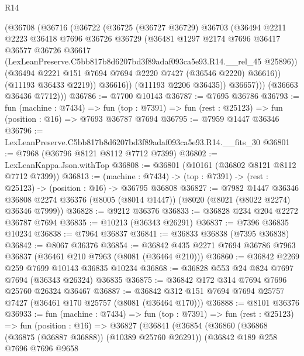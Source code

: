 \begin{lexlean}{R14}
\begin{coremodule}
              (@36708
                (@36716
                  (@36722
                    (@36725
                      (@36727 @36729)
                      @36703
                      (@36494
                        @2211
                        @2223
                        @36418
                        @7696
                        @36726
                        @36729
                        (@36481
                          @1297
                          @2174
                          @7696
                          @36417
                          @36577
                          @36726
                          @36617
                          (LexLeanPreserve.C5bb817b8d6207bd3f89adaf093ca5e93.R14.__rel_45 @25896))
                        (@36494 @2221 @151 @7694 @7694 @2220 @7427 (@36546 @2220) @36616))
                      (@11193 @36433 @2219))
                    @36616))
                (@11193 @2206 @36435))
              @36657)))
        (@36663 @36436 @7712)))
@36786 := @7700 @10143
@36787 := @7695 @36786
@36793 := fun (machine : @7434) =>
  fun (top : @7391) => fun (rest : @25123) => fun (position : @16) => @7693 @36787 @7694
@36795 := @7959 @1447 @36346
@36796 := LexLeanPreserve.C5bb817b8d6207bd3f89adaf093ca5e93.R14.__fits_30
@36801 := @7968 (@36796 @8121 @8112 @7712 @7399)
@36802 := LexLeanKappa.Json.withTop
@36808 := @36801 (@10161 (@36802 @8121 @8112 @7712 @7399))
@36813 := (machine : @7434) -> (top : @7391) -> (rest : @25123) -> (position : @16) -> @36795 @36808
@36827 := @7982
    @1447
    @36346
    @36808
    @2274
    @36376
    (@8005 (@8014 @1447))
    (@8020 (@8021 (@8022 @2274) @36346 @7999))
@36828 := @9212 @36376
@36833 := @36828 @234 @204 @2272 @36787 @7694
@36835 := @10213 (@36343 @26291)
@36837 := @7396 @36835 @10234
@36838 := @7964 @36837
@36841 := @36833 @36838 (@7395 @36838)
@36842 := @8067 @36376
@36854 := @36842 @435 @2271 @7694 @36786 @7963 @36837 (@36461 @210 @7963 (@8081 (@36464 @210)))
@36860 := @36842 @2269 @259 @7699 @10143 @36835 @10234
@36868 := @36828 @553 @24 @824 @7697 @7694 (@36343 @26324) @36835
@36875 := @36842 @172 @314 @7694 @7696 @25760 @26324 @36467
@36887 := @36842 @312 @151 @7694 @7694 @25757 @7427 (@36461 @170 @25757 (@8081 (@36464 @170)))
@36888 := @8101 @36376
@36933 := fun (machine : @7434) =>
  fun (top : @7391) =>
  fun (rest : @25123) =>
  fun (position : @16) =>
  @36827
    (@36841
      (@36854
        (@36860
          (@36868 (@36875 (@36887 @36888)) (@10389 @25760 @26291))
          (@36842
            @189
            @258
            @7696
            @7696
            @9658

\end{coremodule}
\end{lexlean}
